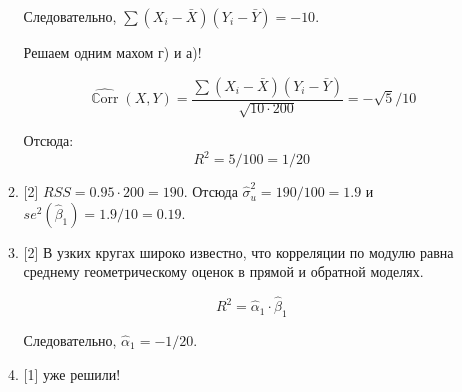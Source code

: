 \documentclass[12pt]{article}
\DeclareMathOperator{\Corr}{\mathbb{C}orr}
\def \hb{\hat{\beta}}
\def \hCorr{\widehat{\Corr}}
\theoremstyle{definition}
\begin{document}
\begin{enumerate}
\begin{enumerate}
    Следовательно, $\sum (X_i - \bar X)(Y_i - \bar Y) = -10$. 

    Решаем одним махом г) и а)!

    \[
    \hCorr(X, Y) = \frac{\sum (X_i - \bar X)(Y_i - \bar Y)}{\sqrt{10\cdot 200}} = -\sqrt{5}/10    
    \]

    Отсюда:
    \[
    R^2 = 5/100 = 1/20   
    \]

    \item {[2]} $RSS = 0.95 \cdot 200 = 190$. Отсюда $\hat\sigma^2_u = 190/100 = 1.9$ и $se^2(\hb_1) = 1.9/10=0.19$.
    \item {[2]} В узких кругах широко известно, что корреляции по модулю равна среднему геометрическому оценок 
    в прямой и обратной моделях. 

    \[
    R^2 = \hat\alpha_1 \cdot \hb_1    
    \]

    Следовательно, $\hat\alpha_1 = -1/20$.

    \item {[1]} уже решили!
\end{enumerate}


\end{enumerate}
\end{document}
